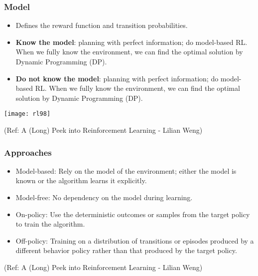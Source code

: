 \begin{frame}[fragile]\frametitle{Model}


\begin{itemize}
\item Defines the reward function and transition probabilities.
\item {\bf Know the model}: planning with perfect information; do model-based RL. When we fully know the
environment, we can find the optimal solution by Dynamic Programming (DP).
\item {\bf Do not know the model}: planning with perfect information; do model-based RL. When we fully know the
environment, we can find the optimal solution by Dynamic Programming (DP).
\end{itemize}


\begin{center}
\texttt{[image: rl98]}
\end{center}


{\tiny (Ref: A (Long) Peek into Reinforcement Learning - Lilian Weng)}


\end{frame}

\begin{frame}[fragile]\frametitle{Approaches}


\begin{itemize}
\item Model-based: Rely on the model of the environment; either the model is known or the algorithm learns it explicitly.
\item Model-free: No dependency on the model during learning.
\item On-policy: Use the deterministic outcomes or samples from the target policy to train the algorithm.
\item Off-policy: Training on a distribution of transitions or episodes produced by a different behavior
policy rather than that produced by the target policy.
\end{itemize}

{\tiny (Ref: A (Long) Peek into Reinforcement Learning - Lilian Weng)}


\end{frame}

